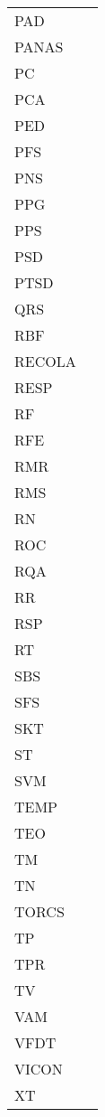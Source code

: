 \begin{tabular}{ll}
         PAD &         \\
       PANAS &         \\
          PC &         \\
         PCA &         \\
         PED &         \\
         PFS &         \\
         PNS &         \\
         PPG &         \\
         PPS &         \\
         PSD &         \\
        PTSD &         \\
         QRS &         \\
         RBF &         \\
      RECOLA &         \\
        RESP &         \\
          RF &         \\
         RFE &         \\
         RMR &         \\
         RMS &         \\
          RN &         \\
         ROC &         \\
         RQA &         \\
          RR &         \\
         RSP &         \\
          RT &         \\
         SBS &         \\
         SFS &         \\
         SKT &         \\
          ST &         \\
         SVM &         \\
        TEMP &         \\
         TEO &         \\
          TM &         \\
          TN &         \\
       TORCS &         \\
          TP &         \\
         TPR &         \\
          TV &         \\
         VAM &         \\
        VFDT &         \\
       VICON &         \\
          XT &         \\
\bottomrule
\end{tabular}
